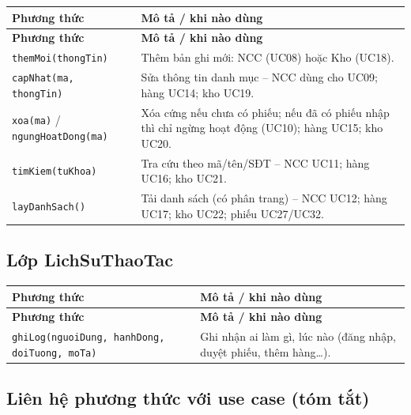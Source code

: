 \begin{longtable}{|p{4.2cm}|p{8.5cm}|}
\hline
\textbf{Phương thức} & \textbf{Mô tả / khi nào dùng} \\
\hline
\endfirsthead
\hline
\textbf{Phương thức} & \textbf{Mô tả / khi nào dùng} \\
\hline
\endhead
\texttt{themMoi(thongTin)} & Thêm bản ghi mới: NCC (UC08) hoặc Kho (UC18). \\
\hline
\texttt{capNhat(ma, thongTin)} & Sửa thông tin danh mục -- NCC dùng cho UC09; hàng UC14; kho UC19. \\
\hline
\texttt{xoa(ma)} / \texttt{ngungHoatDong(ma)} & Xóa cứng nếu chưa có phiếu; nếu đã có phiếu nhập thì chỉ ngừng hoạt động (UC10); hàng UC15; kho UC20. \\
\hline
\texttt{timKiem(tuKhoa)} & Tra cứu theo mã/tên/SĐT -- NCC UC11; hàng UC16; kho UC21. \\
\hline
\texttt{layDanhSach()} & Tải danh sách (có phân trang) -- NCC UC12; hàng UC17; kho UC22; phiếu UC27/UC32. \\
\hline
\end{longtable}

\subsection{Lớp LichSuThaoTac}

\begin{longtable}{|p{4.5cm}|p{8.2cm}|}
\hline
\textbf{Phương thức} & \textbf{Mô tả / khi nào dùng} \\
\hline
\endfirsthead
\hline
\textbf{Phương thức} & \textbf{Mô tả / khi nào dùng} \\
\hline
\endhead
\texttt{ghiLog(nguoiDung, hanhDong, doiTuong, moTa)} & Ghi nhận ai làm gì, lúc nào (đăng nhập, duyệt phiếu, thêm hàng\ldots). \\
\hline
\end{longtable}

\subsection{Liên hệ phương thức với use case (tóm tắt)}


